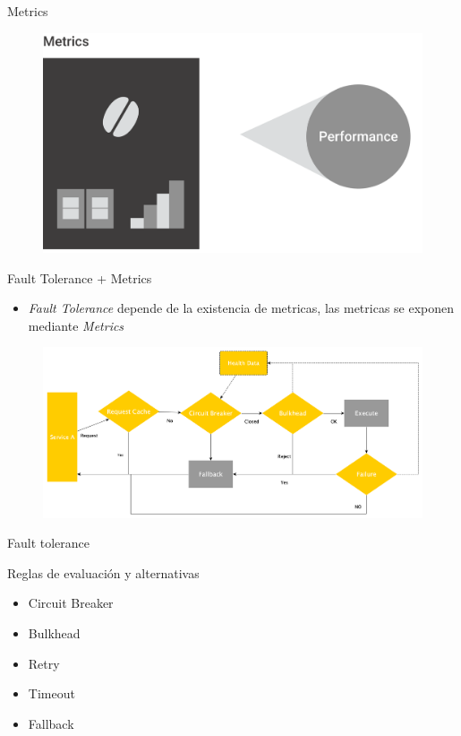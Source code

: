 \documentclass[aspectratio=169]{beamer}
\begin{document}
\begin{frame}{Metrics}
\begin{figure}
	\centering
	\includegraphics[width=0.75\linewidth]{Images/metrics}
\end{figure}
\end{frame}




\begin{frame}{Fault Tolerance + Metrics}

\begin{itemize}
	\item \textit{Fault Tolerance} depende de la existencia de metricas, las metricas se exponen  mediante \textit{Metrics}
\end{itemize}

\begin{figure}
	\centering
	\includegraphics[width=0.9\linewidth]{Images/falldata}
\end{figure}

\end{frame}


\begin{frame}{Fault tolerance}

Reglas de evaluación y alternativas
\begin{itemize}
\item Circuit Breaker
\item Bulkhead
\item Retry
\item Timeout
\item Fallback
\end{itemize}

\end{frame}
\end{document}
